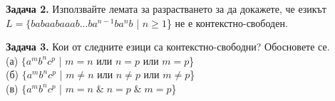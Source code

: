\documentclass{article}
\begin{document}
\vspace{15pt}

\textbf{Задача 2.} Използвайте лемата за разрастването за да докажете, че езикът 
$L = \{babaabaaab...ba^{n-1}ba^nb$ | $n \geq 1$\} не е контекстно-свободен.

\vspace{15pt}

\textbf{Задача 3.} Кои от следните езици са контекстно-свободни? Обосновете се. \\
(а) $\{a^mb^nc^p$ | $m = n$ или $n = p$ или $m = p$\} \\
(б) $\{a^mb^nc^p$ | $m \neq n$ или $n \neq p$ или $m \neq p$\} \\
(в) $\{a^mb^nc^p$ | $m = n \; \& \; n = p \; \& \; m = p$\} \\
\vspace{25pt}
\end{document}
